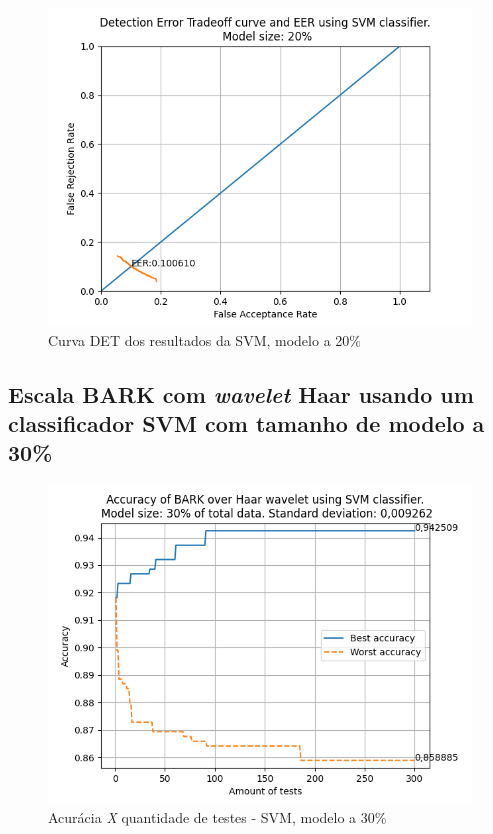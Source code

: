 			\begin{figure}[h]
				\centering
				\includegraphics[width=.8\linewidth]{images/results/det/DET_SVM_20}
				\caption{Curva DET dos resultados da SVM, modelo a 20\%}
				\label{fig:detsvm20}
			\end{figure}
		
			
		
			\forceNewPage
		\subsection{Escala BARK com \textit{wavelet} Haar usando um classificador SVM com tamanho de modelo a 30\%}
			\begin{figure}[ht]
				\centering
				\includegraphics{images/results/confusionMatrices/classifier_SVM_30.png}
				\caption{Acurácia \textit{X} quantidade de testes - SVM, modelo a 30\%}
				\label{fig:classifiersvm30}
			\end{figure}
		
